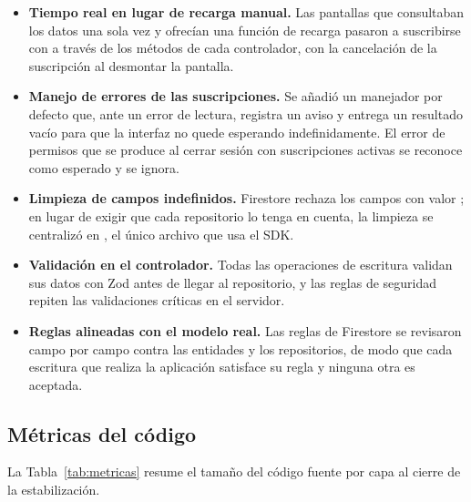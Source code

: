 \begin{itemize}
    \item \textbf{Tiempo real en lugar de recarga manual.} Las pantallas que
    consultaban los datos una sola vez y ofrecían una función de recarga
    pasaron a suscribirse con  a través de los métodos
     de cada controlador, con la cancelación de la
    suscripción al desmontar la pantalla.
    \item \textbf{Manejo de errores de las suscripciones.} Se añadió un
    manejador por defecto que, ante un error de lectura, registra un aviso y
    entrega un resultado vacío para que la interfaz no quede esperando
    indefinidamente. El error de permisos que se produce al cerrar sesión con
    suscripciones activas se reconoce como esperado y se ignora.
    \item \textbf{Limpieza de campos indefinidos.} Firestore rechaza los
    campos con valor ; en lugar de exigir que cada
    repositorio lo tenga en cuenta, la limpieza se centralizó en
    , el único archivo que usa el SDK.
    \item \textbf{Validación en el controlador.} Todas las operaciones de
    escritura validan sus datos con Zod antes de llegar al repositorio, y las
    reglas de seguridad repiten las validaciones críticas en el servidor.
    \item \textbf{Reglas alineadas con el modelo real.} Las reglas de
    Firestore se revisaron campo por campo contra las entidades y los
    repositorios, de modo que cada escritura que realiza la aplicación
    satisface su regla y ninguna otra es aceptada.
\end{itemize}

\subsection{Métricas del código}

La Tabla~\ref{tab:metricas} resume el tamaño del código fuente por capa al
cierre de la estabilización.

